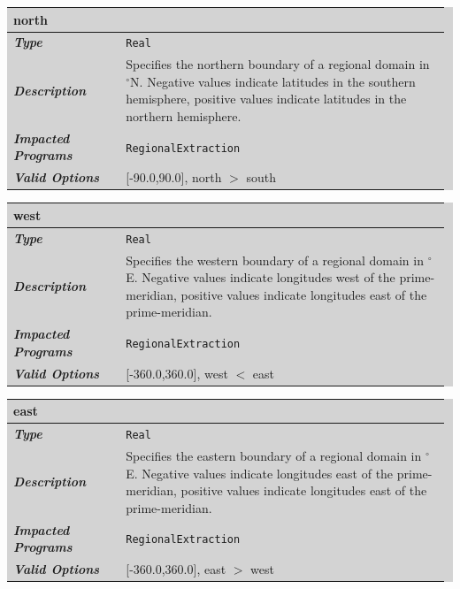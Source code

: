 \documentclass{softwaremanual}
\begin{document}

\noindent\begingroup\setlength{\fboxsep}{0pt}
\colorbox{lightgray}{
\begin{tabular}{p{0.25\linewidth} p{0.725\linewidth}}
\toprule
\textbf{north} & \\
\midrule
\textbf{\textit{Type}} & \texttt{Real} \\
\midrule
\textbf{\textit{Description}} & Specifies the northern boundary of a regional domain in $^\circ$N. Negative values indicate latitudes in the southern hemisphere, positive values indicate latitudes in the northern hemisphere. \\
\midrule
\textbf{\textit{Impacted Programs}} & \texttt{RegionalExtraction} \\
\midrule
\textbf{\textit{Valid Options}}  & [-90.0,90.0], north $>$ south \\
\bottomrule
\end{tabular}
}\endgroup


\noindent\begingroup\setlength{\fboxsep}{0pt}
\colorbox{lightgray}{
\begin{tabular}{p{0.25\linewidth} p{0.725\linewidth}}
\toprule
\textbf{west} & \\
\midrule
\textbf{\textit{Type}} & \texttt{Real} \\
\midrule
\textbf{\textit{Description}} & Specifies the western boundary of a regional domain in $^\circ$E. Negative values indicate longitudes west of the prime-meridian, positive values indicate longitudes east of the prime-meridian. \\
\midrule
\textbf{\textit{Impacted Programs}} & \texttt{RegionalExtraction} \\
\midrule
\textbf{\textit{Valid Options}}  & [-360.0,360.0], west $<$ east \\
\bottomrule
\end{tabular}
}\endgroup


\noindent\begingroup\setlength{\fboxsep}{0pt}
\colorbox{lightgray}{
\begin{tabular}{p{0.25\linewidth} p{0.725\linewidth}}
\toprule
\textbf{east} & \\
\midrule
\textbf{\textit{Type}} & \texttt{Real} \\
\midrule
\textbf{\textit{Description}} & Specifies the eastern boundary of a regional domain in $^\circ$E. Negative values indicate longitudes east of the prime-meridian, positive values indicate longitudes east of the prime-meridian. \\
\midrule
\textbf{\textit{Impacted Programs}} & \texttt{RegionalExtraction} \\
\midrule
\textbf{\textit{Valid Options}}  & [-360.0,360.0], east $>$ west \\
\bottomrule
\end{tabular}
}\endgroup
\end{document}
